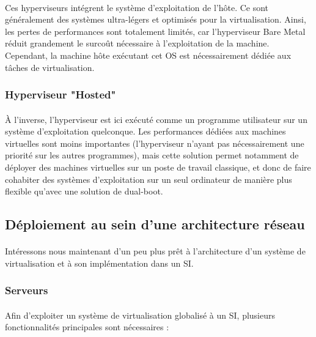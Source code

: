 \paragraph{} Ces hyperviseurs intégrent le système d'exploitation de l'hôte. Ce
sont généralement des systèmes ultra-légers et optimisés pour la virtualisation.
Ainsi, les pertes de performances sont totalement limités, car l'hyperviseur
Bare Metal réduit grandement le surcoût nécessaire à l'exploitation de la
machine. Cependant, la machine hôte exécutant cet OS est nécessairement dédiée
aux tâches de virtualisation.

\subsubsection{Hyperviseur "Hosted"}

\paragraph{} À l'inverse, l'hyperviseur est ici exécuté comme un programme
utilisateur sur un système d'exploitation quelconque. Les performances dédiées
aux machines virtuelles sont moins importantes (l'hyperviseur n'ayant pas
nécessairement une priorité sur les autres programmes), mais cette solution
permet notamment de déployer des machines virtuelles sur un poste de travail
classique, et donc de faire cohabiter des systèmes d'exploitation sur un
seul ordinateur de manière plus flexible qu'avec une solution de dual-boot.

\subsection{Déploiement au sein d'une architecture réseau}

\paragraph{} Intéressons nous maintenant d'un peu plus prêt à l'architecture
d'un système de virtualisation et à son implémentation dans un SI.

\subsubsection{Serveurs}

\paragraph{} Afin d'exploiter un système de virtualisation globalisé à un SI,
plusieurs fonctionnalités principales sont nécessaires :

